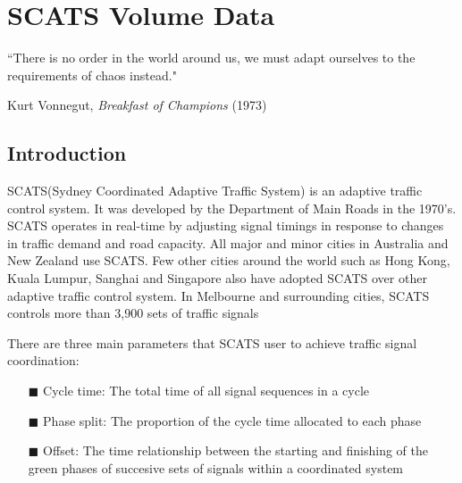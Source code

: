 
\chapter{SCATS Volume Data} %

\label{Chapter3}


``There is no order in the world around us, we must adapt ourselves to the requirements of chaos
instead."

\begin{flushright}
Kurt Vonnegut, \textit{Breakfast of Champions} (1973)
\end{flushright}

\section{Introduction}
SCATS(Sydney Coordinated Adaptive Traffic System) is an adaptive traffic control system. It was
developed by the Department of Main Roads in the 1970's. SCATS operates in real-time by adjusting
signal timings in response to changes in traffic demand and road capacity. All major and minor
cities in Australia and New Zealand use SCATS. Few other cities around the world such as Hong
Kong, Kuala Lumpur, Sanghai and Singapore also have adopted SCATS over other adaptive traffic
control system. In Melbourne and surrounding cities, SCATS controls more than 3,900 sets of traffic
signals

There are three main parameters that SCATS user to achieve traffic signal coordination:
\begin{itemize}
\item[\tiny{$\blacksquare$}] Cycle time: The total time of all signal sequences in a cycle
\item[\tiny{$\blacksquare$}] Phase split: The proportion of the cycle time allocated to each phase
\item[\tiny{$\blacksquare$}] Offset: The time relationship between the starting and finishing of
the green phases of succesive sets of signals within a coordinated system
\end{itemize}

